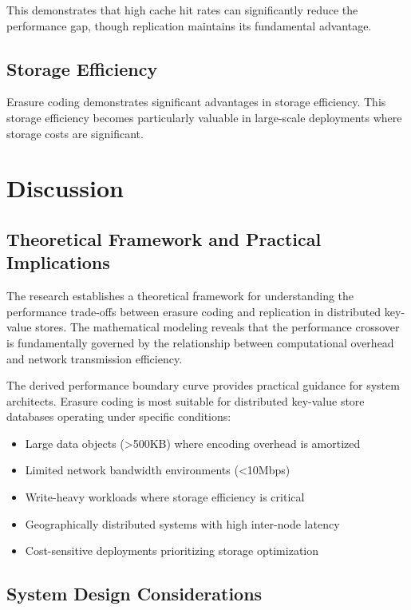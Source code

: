 This demonstrates that high cache hit rates can significantly reduce the performance gap, though replication maintains its fundamental advantage.

\subsection{Storage Efficiency}

Erasure coding demonstrates significant advantages in storage efficiency. This storage efficiency becomes particularly valuable in large-scale deployments where storage costs are significant.

\section{Discussion}

\subsection{Theoretical Framework and Practical Implications}

The research establishes a theoretical framework for understanding the performance trade-offs between erasure coding and replication in distributed key-value stores. The mathematical modeling reveals that the performance crossover is fundamentally governed by the relationship between computational overhead and network transmission efficiency.

The derived performance boundary curve provides practical guidance for system architects. Erasure coding is most suitable for distributed key-value store databases operating under specific conditions:
\begin{itemize}
\item Large data objects (>500KB) where encoding overhead is amortized
\item Limited network bandwidth environments (<10Mbps)
\item Write-heavy workloads where storage efficiency is critical
\item Geographically distributed systems with high inter-node latency
\item Cost-sensitive deployments prioritizing storage optimization
\end{itemize}

\subsection{System Design Considerations}

